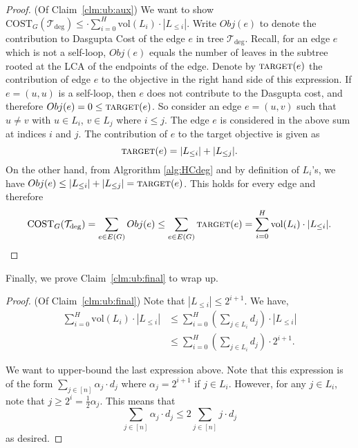 \documentclass[letterpaper,11pt]{article}
\newcommand{\tdeg}{\mathcal{T}_{\deg}}
\newcommand{\target}{\textsc{target}}
\newcommand{\CT}{\text{COST}}
\theoremstyle{plain}
\theoremstyle{definition}
\theoremstyle{remark}
\newcommand{\vol}{\text{vol}}
\begin{document}
\begin{proof} (Of Claim~\ref{clm:ub:aux})
	We want to show 
	$\CT_G(\tdeg) \leq \cdot \sum_{i = 0}^{H} \vol(L_i) \cdot |L_{\leq i}|$.
	Write $Obj(e)$ to denote the contribution to Dasgupta Cost of the 
	edge $e$ in tree $\tdeg$. Recall, for an edge $e$ which is not a self-loop,  $Obj(e)$ equals the number of leaves in the
	subtree rooted at the LCA of the endpoints of the edge. 
    Denote by $\target(e)$
	the contribution of edge $e$ to the objective in the right hand side of 
	this expression. If $e = (u,u)$ is a self-loop, then $e$ does not contribute to the Dasgupta cost, and therefore $Obj(e) = 0 \leq \target(e)$.
    So consider an edge $e = (u,v)$ such that $u \neq v$ with $u \in L_i$, $v \in L_j$
	where $i \leq j$. The edge $e$ is considered in the above sum at indices $i$ and
	$j$. The contribution of $e$ to the target objective is given
	as $$\target(e) = |L_{\leq i}| + |L_{\leq j}|.$$ On the other hand, from Algrorithm \ref{alg:HCdeg} and by 
	definition of $L_i$'s, we have $Obj(e) \leq |L_{\leq i}|+ |L_{\leq j}| = \target(e)$. This
	holds for every edge and therefore 
	$$\CT_G(\tdeg) = \sum_{e \in E(G)} Obj(e) \leq \sum_{e \in E(G)} \target(e) = \sum_{i=0}^{H} \vol(L_i) \cdot |L_{\leq i}|.$$
\end{proof}

Finally, we prove Claim~\ref{clm:ub:final} to wrap up. 

\begin{proof} (Of Claim~\ref{clm:ub:final})
	Note that $|L_{\leq i}| \leq 2^{i+1}$. We have,
	\begin{align*}
		\sum_{i=0}^{H} \vol(L_i) \cdot |L_{\leq i}| &\leq \sum_{i=0}^{H} \left( \sum_{j \in L_i} d_j \right) \cdot |L_{\leq i}| \\
		&\leq \sum_{i=0}^{H} \left( \sum_{j \in L_i} d_j \right) \cdot 2^{i+1}. 
	\end{align*}
	
	We want to upper-bound the last expression above. Note that this expression is
	of the form $\sum_{j \in [n]} \alpha_j \cdot d_j$ where $\alpha_j = 2^{i+1}$ if $j \in L_i$.
	However, for any $j \in L_i$, note that $j \geq  2^{i} = \frac{1}{2} \alpha_j$. This means that
	$$\sum_{j \in [n]} \alpha_j\cdot  d_j \leq 2 \sum_{j \in [n]} j\cdot  d_j$$ as desired.
\end{proof}
\end{document}
